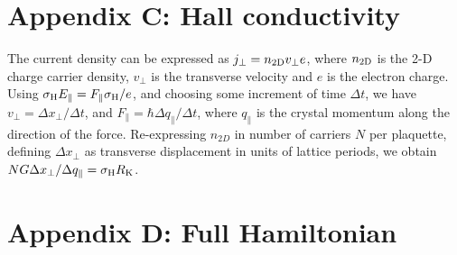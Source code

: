 \section*{Appendix C: Hall conductivity} The current density can be expressed as $j_{\perp}=n_{2\rm{D}}v_{\perp}e$, where $n_{2\rm{D}}$ is the 2-D charge carrier density, $v_{\perp}$ is the transverse velocity and $e$ is the electron charge. Using $\sigma_{\rm{H}} E_{\parallel}=F_{\parallel}\sigma_{\rm{H}}/e$, and choosing some increment of time $\Delta t$, we have $v_{\perp}=\Delta x_{\perp}/\Delta t$, and $F_{\parallel} = \hbar \Delta q_{\parallel}/\Delta t$, where $q_{\parallel}$ is the crystal momentum along the direction of the force. Re-expressing $n_{2D}$ in number of carriers $N$ per plaquette, defining $\Delta x_{\perp}$ as transverse displacement in units of lattice periods, we obtain $N G\Delta x_{\perp}/ \Delta q_{\parallel}=\sigma_{\rm{H}} R_{\rm{K}}$.


\section*{Appendix D: Full Hamiltonian}
%

